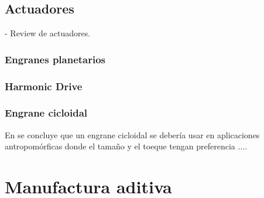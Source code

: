 \subsection{Actuadores}\label{sec:actuadores}

\cite{Pham2018} - Review de actuadores.

\subsubsection{Engranes planetarios}
\subsubsection{Harmonic Drive}
\subsubsection{Engrane cicloidal}

En \cite{Sensinger2012} se concluye que un engrane cicloidal se debería usar en aplicaciones antropomórficas donde el tamaño y el toeque tengan preferencia ....

\section{Manufactura aditiva}

